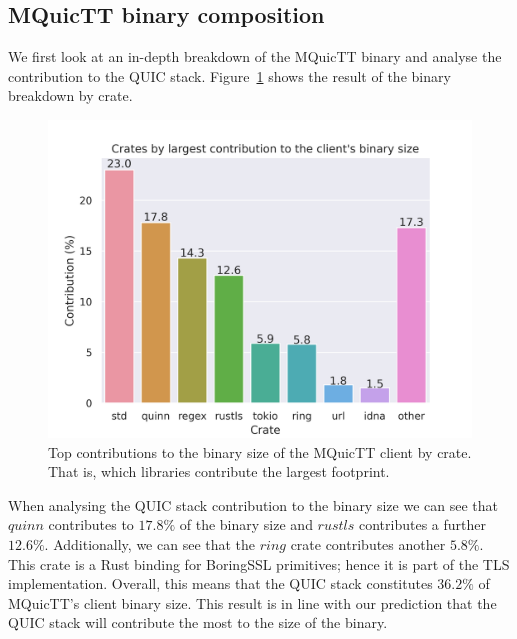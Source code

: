 \subsection{MQuicTT binary composition} \label{sec:binary_sizes}

We first look at an in-depth breakdown of the MQuicTT binary and analyse the contribution to the QUIC stack.
Figure~\ref{fig:mquictt_client_bin} shows the result of the binary breakdown by crate.

\begin{figure}[ht]
    \centering
    \includegraphics[width=1\linewidth]{images/mquictt_binary_client.png}
    \caption{Top contributions to the binary size of the MQuicTT client by crate. That is, which libraries contribute the largest footprint.}
    \label{fig:mquictt_client_bin}
\end{figure}

When analysing the QUIC stack contribution to the binary size we can see that $quinn$ contributes to $17.8\%$ of the binary size and $rustls$ contributes a further $12.6\%$.
Additionally, we can see that the $ring$ crate contributes another $5.8\%$.
This crate is a Rust binding for BoringSSL primitives; hence it is part of the TLS implementation.
Overall, this means that the QUIC stack constitutes $36.2\%$ of MQuicTT's client binary size.
This result is in line with our prediction that the QUIC stack will contribute the most to the size of the binary.

